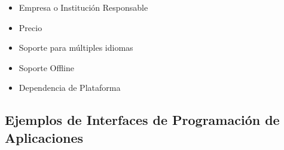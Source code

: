 \begin{itemize}
	\item Empresa o Instituci\'on Responsable
	\item Precio
	\item Soporte para m\'ultiples idiomas
	\item Soporte Offline
	\item Dependencia de Plataforma
\end{itemize}


\subsection{Ejemplos de Interfaces de Programaci\'on de Aplicaciones}







